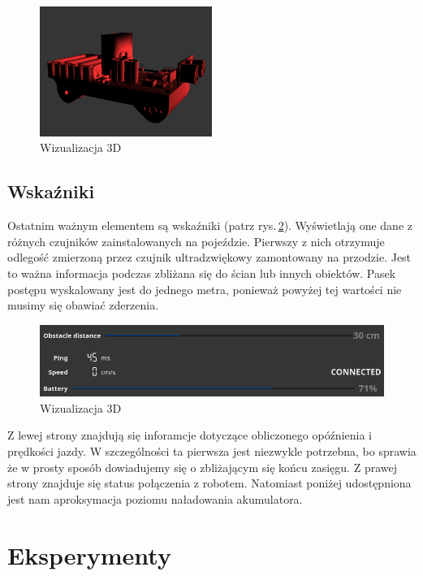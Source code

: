 \documentclass[12pt,a4paper,polish]{article}
\begin{document}
  \begin{figure}[h]
    \centering
    \includegraphics[width=0.5\textwidth]{img/final/3d.png}
    \caption{Wizualizacja 3D}
    \label{fig:3d}
  \end{figure}


  \subsection{Wskaźniki}
  Ostatnim ważnym elementem są wskaźniki (patrz rys.\,\ref{fig:indications}). Wyświetlają one dane z różnych
  czujników zainstalowanych na pojeździe. Pierwszy z nich otrzymuje odlegość
  zmierzoną przez czujnik ultradzwiękowy zamontowany na przodzie. Jest to 
  ważna informacja podczas zbliżana się do ścian lub innych obiektów.
  Pasek postępu wyskalowany jest do jednego metra, ponieważ powyżej tej 
  wartości nie musimy się obawiać zderzenia.

  \begin{figure}[h]
    \centering
    \includegraphics[width=1\textwidth]{img/final/wska.png}
    \caption{Wizualizacja 3D}
    \label{fig:indications}
  \end{figure}

  Z lewej strony znajdują się inforamcje dotyczące obliczonego opóźnienia i
  prędkości jazdy. W szczególności ta pierwsza jest niezwykle potrzebna, bo
  sprawia że w prosty sposób dowiadujemy się o zbliżającym się końcu zasięgu.
  Z prawej strony znajduje się status połączenia z robotem. Natomiast poniżej
  udostępniona jest nam aproksymacja poziomu naładowania akumulatora.


  \section{Eksperymenty}
\end{document}
